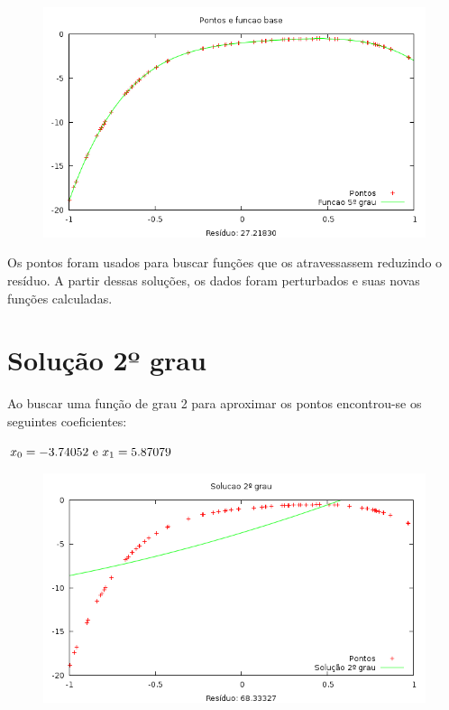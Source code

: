 \begin{figure}[h]
\centering
\includegraphics[scale=0.7]{funcbase}
\end{figure}

Os pontos foram usados para buscar funções que os atravessassem reduzindo o resíduo.
A partir dessas soluções, os dados foram perturbados e suas novas funções calculadas.



\newpage
\section{Solução 2º grau}

Ao buscar uma função de grau 2 para aproximar os pontos encontrou-se os seguintes 
coeficientes:

\(x_0 = -3.74052 ~$e$~  x_1 = 5.87079 \)

\begin{figure}[h]
\centering
\includegraphics[scale=0.7]{sol2grau}
\end{figure}

